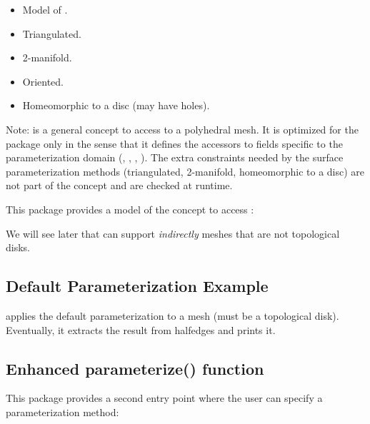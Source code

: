 \begin{itemize}

\item Model of .

\item Triangulated.

\item 2-manifold.

\item Oriented.

\item Homeomorphic to a disc (may have holes).

\end{itemize}

Note:  is a general concept to access to a
polyhedral mesh.
It is optimized for the  package
only in the sense that it
defines the accessors to fields specific to the parameterization domain
(, , , ).
The extra constraints  needed by the surface parameterization methods (triangulated,
2-manifold, homeomorphic to a disc) are not part of the concept and
are checked at runtime.

This package provides a model of the  concept
to access : \\

We will see later that  can support \emph{indirectly}
meshes that are not topological disks.


\subsection{Default Parameterization Example}

 applies the default parameterization to a
 mesh (must be a topological disk).
Eventually, it extracts the result from halfedges and prints it.



\subsection{Enhanced parameterize() function}

This package provides a second  entry point
where the user can specify a parameterization method:

